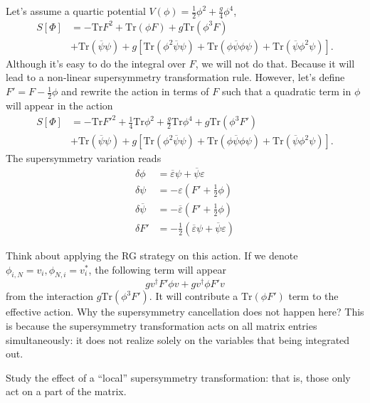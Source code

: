 Let's assume a quartic potential $V(\phi) = \frac{1}{2} \phi^2 + \frac{g}{4} \phi^4$,
\begin{align*}
	S[\Phi] &= -\mathrm{Tr} F^2 + \mathrm{Tr} (\phi F) + g \mathrm{Tr}(\phi^3 F) 	 \\
			& + \mathrm{Tr}(\overline{\psi}\psi) + g \left[ \mathrm{Tr}(\phi^2 \overline{\psi} \psi) + \mathrm{Tr} (\phi \overline{\psi} \phi \psi) + \mathrm{Tr}(\overline{\psi} \phi^2 \psi) \right] .
\end{align*}
Although it's easy to do the integral over $F$, we will not do that.
Because it will lead to a non-linear supersymmetry transformation rule.
However, let's define $F' = F - \frac{1}{2} \phi$ and rewrite the action in terms of $F$ such that a quadratic term in $\phi$ will appear in the action
\begin{align*}
	S[\Phi] &= -\mathrm{Tr} F'^2 + \frac{1}{4} \mathrm{Tr} \phi^2 + \frac{g}{2} \mathrm{Tr} \phi^4 + g \mathrm{Tr} (\phi^3 F') 	 \\
			& + \mathrm{Tr}(\overline{\psi}\psi) + g \left[ \mathrm{Tr}(\phi^2 \overline{\psi} \psi) + \mathrm{Tr} (\phi \overline{\psi} \phi \psi) + \mathrm{Tr}(\overline{\psi} \phi^2 \psi) \right] .
\end{align*}
The supersymmetry variation reads
\begin{align*}
	\delta \phi &= \overline{\varepsilon} \psi + \overline{\psi} \varepsilon \\
	\delta \psi &= -\varepsilon (F' + \frac{1}{2}\phi) \\
	\delta \overline{\psi} &= - \overline{\varepsilon} (F' + \frac{1}{2}\phi) \\
	\delta F' &= -\frac{1}{2} (\overline{\varepsilon}\psi + \overline{\psi}\varepsilon)
\end{align*}

Think about applying the RG strategy on this action.
If we denote $\phi_{i,N}=v_i,\phi_{N,i}=v_i^*$, the following term will appear
\[
g v^\dagger F' \phi v + g v^\dagger \phi F' v
\] 
from the interaction $g \mathrm{Tr} (\phi^3 F')$.
It will contribute a $\mathrm{Tr}(\phi F')$ term to the effective action.
Why the supersymmetry cancellation does not happen here?
This is because the supersymmetry transformation acts on all matrix entries simultaneously: it does not realize solely on the variables that being integrated out.

\begin{idea}
Study the effect of a ``local'' supersymmetry transformation: that is, those only act on a part of the matrix.	
\end{idea}

